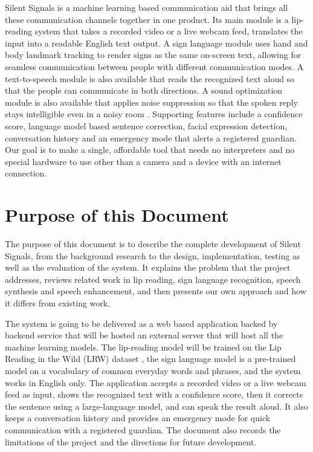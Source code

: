 \documentclass{FastFyp}
\begin{document}
Silent Signals is a machine learning based communication aid that brings all these communication channels together in one product. Its main module is a lip-reading system that takes a recorded video or a live webcam feed, translates the input into a readable English text output. 
A sign language module uses hand and body landmark tracking to render signs as the same on-screen text, allowing for seamless communication between people with different communication modes. A text-to-speech module is also available that reads the recognized text aloud so that the people can communicate in both directions. A sound optimization module is also available that applies noise suppression so that the spoken reply stays intelligible even in a noisy room \cite{valin2018hybrid}. Supporting features include a confidence score, language model based sentence correction, facial expression detection, conversation history and an emergency mode that alerts a registered guardian. 
Our goal is to make a single, affordable tool that needs no interpreters and no special hardware to use other than a camera and a device with an internet connection.

\section{Purpose of this Document}
\textbf{}
The purpose of this document is to describe the complete development of Silent Signals, from the background research to the design, implementation, testing as well as the evaluation of the system. 
It explains the problem that the project addresses, reviews related work in lip reading, sign language recognition, speech synthesis and speech enhancement, and then presents our own approach and how it differs from existing work. 

The system is going to be delivered as a web based application backed by backend service that will be hosted an external server that will host all the machine learning models. 
The lip-reading model will be trained on the Lip Reading in the Wild (LRW) dataset \cite{ref:Chung:2016}, 
the sign language model is a pre-trained model on a vocabulary of common everyday words and phrases, and the system works in English only. 
The application accepts a recorded video or a live webcam feed as input, shows the recognized text with a confidence score, 
then it corrects the sentence using a large-language model, and can speak the result aloud. It also keeps a conversation history and provides an emergency mode for quick communication with a registered guardian. 
The document also records the limitations of the project and the directions for future development.
\end{document}
